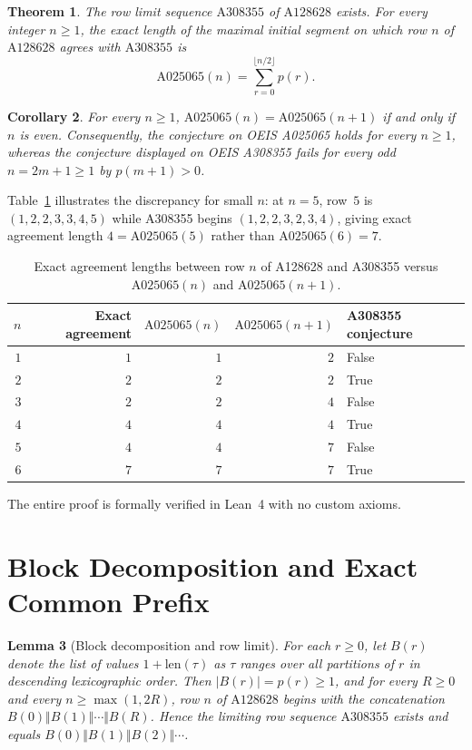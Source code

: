 \documentclass[11pt]{article}
\newtheorem{theorem}{Theorem}
\newtheorem{lemma}[theorem]{Lemma}
\newtheorem{corollary}[theorem]{Corollary}
\begin{document}
\begin{theorem}\label{thm:main}
The row limit sequence $\mathrm{A308355}$ of $\mathrm{A128628}$ exists. For every integer $n \ge 1$, the exact length of the maximal initial segment on which row $n$ of $\mathrm{A128628}$ agrees with $\mathrm{A308355}$ is
\[
\mathrm{A025065}(n) = \sum_{r=0}^{\lfloor n/2 \rfloor} p(r).
\]
\end{theorem}

\begin{corollary}\label{cor:odd}
For every $n \ge 1$, $\mathrm{A025065}(n) = \mathrm{A025065}(n+1)$ if and only if $n$ is even. Consequently, the conjecture on OEIS A025065 holds for every $n \ge 1$, whereas the conjecture displayed on OEIS A308355 fails for every odd $n = 2m+1 \ge 1$ by $p(m+1) > 0$.
\end{corollary}

Table~\ref{tab:small} illustrates the discrepancy for small $n$: at $n = 5$, row~$5$ is $(1,2,2,3,3,4,5)$ while A308355 begins $(1,2,2,3,2,3,4)$, giving exact agreement length $4 = \mathrm{A025065}(5)$ rather than $\mathrm{A025065}(6) = 7$.

\begin{table}[ht]
\centering
\begin{tabular}{@{}rrrrl@{}}
\toprule
$n$ & Exact agreement & $\mathrm{A025065}(n)$ & $\mathrm{A025065}(n+1)$ & A308355 conjecture \\
\midrule
$1$ & $1$ & $1$ & $2$ & False \\
$2$ & $2$ & $2$ & $2$ & True \\
$3$ & $2$ & $2$ & $4$ & False \\
$4$ & $4$ & $4$ & $4$ & True \\
$5$ & $4$ & $4$ & $7$ & False \\
$6$ & $7$ & $7$ & $7$ & True \\
\bottomrule
\end{tabular}
\caption{Exact agreement lengths between row $n$ of A128628 and A308355 versus $\mathrm{A025065}(n)$ and $\mathrm{A025065}(n+1)$.}
\label{tab:small}
\end{table}

The entire proof is formally verified in Lean~4 with no custom axioms.

\section{Block Decomposition and Exact Common Prefix}

\begin{lemma}[Block decomposition and row limit]\label{lem:limit}
For each $r \ge 0$, let $B(r)$ denote the list of values $1 + \mathrm{len}(\tau)$ as $\tau$ ranges over all partitions of $r$ in descending lexicographic order. Then $|B(r)| = p(r) \ge 1$, and for every $R \ge 0$ and every $n \ge \max(1, 2R)$, row $n$ of $\mathrm{A128628}$ begins with the concatenation $B(0) \Vert B(1) \Vert \cdots \Vert B(R)$. Hence the limiting row sequence $\mathrm{A308355}$ exists and equals $B(0) \Vert B(1) \Vert B(2) \Vert \cdots$.
\end{lemma}
\end{document}
